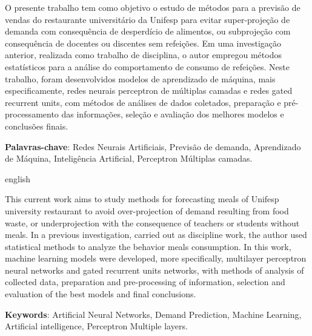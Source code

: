 \documentclass[	12pt, Times, openright, twoside, a4paper, english, brazil]{abntex2}
\begin{document}

    \begin{resumo}
         O presente trabalho tem como objetivo o estudo de métodos para a previsão de vendas do restaurante universitário da Unifesp para evitar super-projeção de demanda com consequência de desperdício de alimentos, ou subprojeção com consequência de docentes ou discentes sem refeições. Em uma investigação anterior, realizada como trabalho de disciplina, o autor empregou métodos estatísticos para a análise do comportamento de consumo de refeições. Neste trabalho, foram desenvolvidos modelos de aprendizado de máquina, mais especificamente, redes neurais perceptron de múltiplas camadas e redes gated recurrent units, com métodos de análises de dados coletados, preparação e pré-processamento das informações, seleção e avaliação dos melhores modelos e conclusões finais.
     
     \vspace{\onelineskip}
        
     \noindent
     \textbf{Palavras-chave}: Redes Neurais Artificiais, Previsão de demanda, Aprendizado de Máquina, Inteligência Artificial, Perceptron Múltiplas camadas. 
     
    \end{resumo}

    \begin{resumo}[Abstract]
     \begin{otherlanguage*}{english}


        This current work aims to study methods for forecasting meals of Unifesp university restaurant to avoid over-projection of demand resulting from food waste, or underprojection with the consequence of teachers or students without meals. In a previous investigation, carried out as discipline work, the author used statistical methods to analyze the behavior meals consumption. In this work, machine learning models were developed, more specifically, multilayer perceptron neural networks and gated recurrent units networks, with methods of analysis of collected data, preparation and pre-processing of information, selection and evaluation of the best models and final conclusions.

       \vspace{\onelineskip}
     
       \noindent 
       \textbf{Keywords}: Artificial Neural Networks, Demand Prediction, Machine Learning, Artificial intelligence, Perceptron Multiple layers.
     \end{otherlanguage*}
    \end{resumo}
\end{document}
